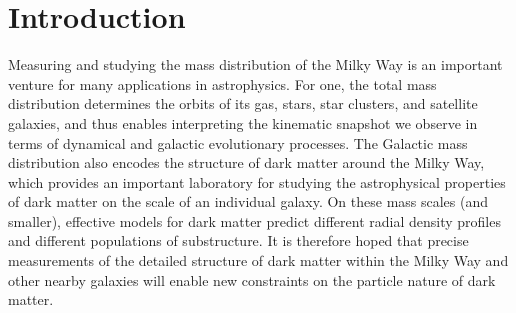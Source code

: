 \begin{abstract}

\end{abstract}


\section{Introduction} \label{sec:intro}

Measuring and studying the mass distribution of the Milky Way is an important venture
for many applications in astrophysics.
For one, the total mass distribution determines the orbits of its gas, stars, star
clusters, and satellite galaxies, and thus enables interpreting the kinematic snapshot
we observe in terms of dynamical and galactic evolutionary processes.
The Galactic mass distribution also encodes the structure of dark matter around the
Milky Way, which provides an important laboratory for studying the astrophysical
properties of dark matter on the scale of an individual galaxy.
On these mass scales (and smaller), effective models for dark matter predict different
radial density profiles and different populations of substructure.
It is therefore hoped that precise measurements of the detailed structure of dark matter
within the Milky Way and other nearby galaxies will enable new constraints on the
particle nature of dark matter.

